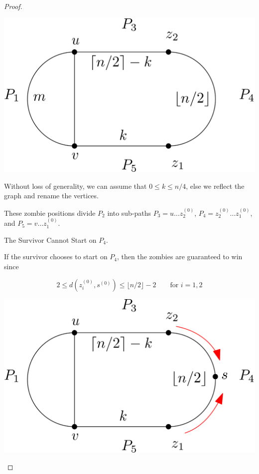 \documentclass[letterpaper, 10pt]{article}
\begin{document}
\begin{proof}
\begin{proofpart}
\begin{center}
\includegraphics[scale=0.15]{diagram1.png}
\end{center}

Without loss of generality, we can assume that $0 \leq k \leq n/4$,
else we reflect the graph and rename the vertices.

These zombie positions divide $P_2$ into sub-paths $P_3 = u \dots z_2^{(0)}$,
$P_4 = z_2^{(0)} \dots z_1^{(0)}$, and
$P_5 = v \dots z_1^{(0)}$.
\end{proofpart}

\begin{proofpart} The Survivor Cannot Start on $P_4$.

If the survivor chooses to start on $P_4$, then the zombies are guaranteed to win
since

\[ 2 \leq d(z_i^{(0)}, s^{(0)}) \leq \lfloor n/2 \rfloor - 2 \qquad \text{for $i = 1,2$} \]

\begin{center}
\includegraphics[scale=0.15]{diagram2}
\end{center}


\end{proofpart}
\end{proof}
\end{document}
